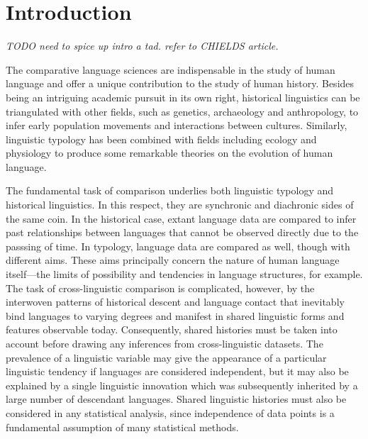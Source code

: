 

\hypertarget{pcm-intro}{%
\section{Introduction}\label{pcm-intro}}


\emph{TODO need to spice up intro a tad. refer to CHIELDS article.}

The comparative language sciences are indispensable in the study of human language and offer a unique contribution to the study of human history. Besides being an intriguing academic pursuit in its own right, historical linguistics can be triangulated with other fields, such as genetics, archaeology and anthropology, to infer early population movements and interactions between cultures. Similarly, linguistic typology has been combined with fields including ecology and physiology to produce some remarkable theories on the evolution of human language.

The fundamental task of comparison underlies both linguistic typology and historical linguistics. In this respect, they are synchronic and diachronic sides of the same coin. In the historical case, extant language data are compared to infer past relationships between languages that cannot be observed directly due to the passsing of time. In typology, language data are compared as well, though with different aims. These aims principally concern the nature of human language itself---the limits of possibility and tendencies in language structures, for example. The task of cross-linguistic comparison is complicated, however, by the interwoven patterns of historical descent and language contact that inevitably bind languages to varying degrees and manifest in shared linguistic forms and features observable today. Consequently, shared histories must be taken into account before drawing any inferences from cross-linguistic datasets. The prevalence of a linguistic variable may give the appearance of a particular linguistic tendency if languages are considered independent, but it may also be explained by a single linguistic innovation which was subsequently inherited by a large number of descendant languages. Shared linguistic histories must also be considered in any statistical analysis, since independence of data points is a fundamental assumption of many statistical methods.

